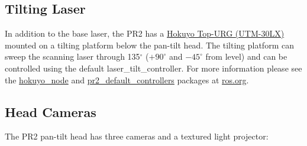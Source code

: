 \subsection{Tilting Laser}
In addition to the base laser, the PR2 has a \href{http://www.hokuyo-aut.jp/02sensor/07scanner/utm_30lx.html}{Hokuyo Top-URG (UTM-30LX)}
mounted on a tilting platform below the pan-tilt head. The tilting platform can sweep the scanning 
laser through 135$^\circ$ ($+90^\circ$ and $-45^\circ$ from level) and can be controlled using the
default laser\_tilt\_controller. For more information please see the \href{http://www.ros.org/wiki/hokuyo_node}{hokuyo\_node} 
and \href{http://www.ros.org/wiki/pr2_default_controllers}{pr2\_default\_controllers} packages at \href{http://www.ros.org}{ros.org}.

\subsection{Head Cameras}
The PR2 pan-tilt head has three cameras and a textured light projector:
